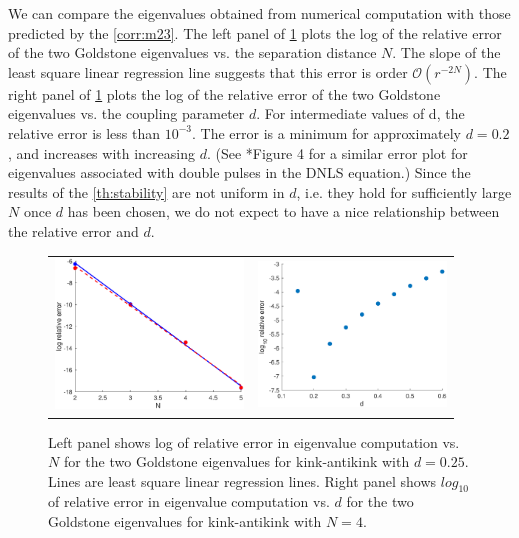 \documentclass[12pt]{article}
\begin{document}
We can compare the eigenvalues obtained from numerical computation with those predicted by the \cref{corr:m23}. The left panel of \cref{fig:kakeigerror} plots the log of the relative error of the two Goldstone eigenvalues vs. the separation distance $N$. The slope of the least square linear regression line suggests that this error is order $\mathcal{O}(r^{-2N})$. The right panel of \cref{fig:kakeigerror} plots the log of the relative error of the two Goldstone eigenvalues vs. the coupling parameter $d$. For intermediate values of d, the relative error is less than $10^{-3}$. The error is a minimum for approximately $d = 0.2$, and increases with increasing $d$. (See \cite{Parker2020}*{Figure 4} for a similar error plot for eigenvalues associated with double pulses in the DNLS equation.) Since the results of the \cref{th:stability} are not uniform in $d$, i.e. they hold for sufficiently large $N$ once $d$ has been chosen, we do not expect to have a nice relationship between the relative error and $d$.

\begin{figure}[H]
	\begin{center}
	\begin{tabular}{cc}
	\includegraphics[width=5cm]{goldstoned025relerror.eps} &
	\includegraphics[width=5cm]{goldstoneN4relativeerror.eps}
	\end{tabular}
	\end{center}
	\caption{Left panel shows log of relative error in eigenvalue computation vs. $N$ for the two Goldstone eigenvalues for kink-antikink with $d = 0.25$. Lines are least square linear regression lines. Right panel shows $log_{10}$ of relative error in eigenvalue computation vs. $d$ for the two Goldstone eigenvalues for kink-antikink with $N = 4$.} 
	\label{fig:kakeigerror}
\end{figure}
\end{document}
